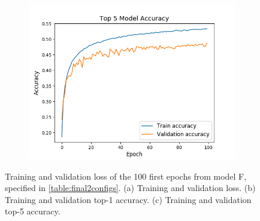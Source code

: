 \begin{figure}[!h]
\begin{subfigure}[b]{0.32\textwidth}
            \centering
            \includegraphics[width=\textwidth]{../images/adam_final_no_fc_100batch_top5.png}
            \caption[]%
            {{\small }}
        \end{subfigure}
        \caption[]
        {\small Training and validation loss of the 100 first epochs from model F, specified in \ref{table:final2configs}. (a) Training and validation loss. (b) Training and validation top-1 accuracy. (c) Training and validation top-5 accuracy.}
        \label{fig:final_plots_f}
    \end{figure}
\FloatBarrier
